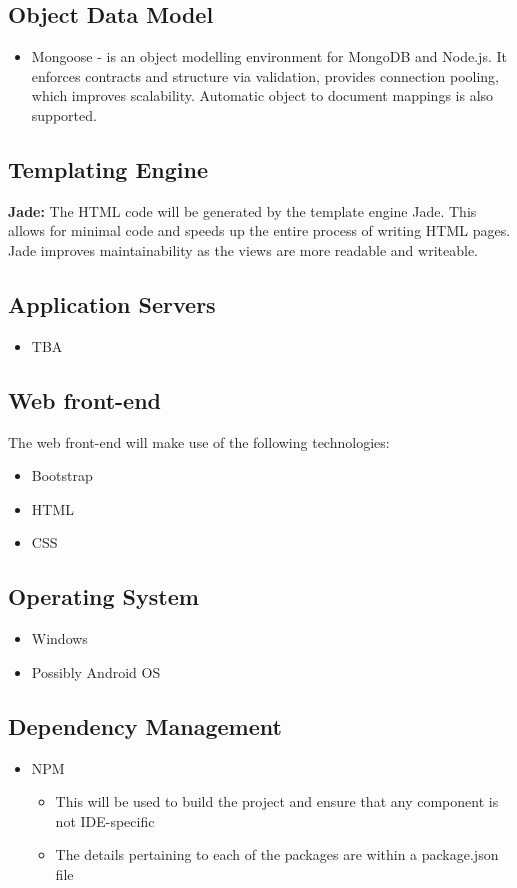 \subsection{Object Data Model}
\begin{itemize}
	\item Mongoose - is an object modelling environment for MongoDB and Node.js. It enforces contracts and structure via validation, provides connection pooling, which improves scalability. Automatic object to document mappings is also supported.
\end{itemize}

\subsection{Templating Engine}
\textbf{Jade:} The HTML code will be generated by the template engine Jade. This allows for minimal code and speeds up the entire process of writing HTML pages. Jade improves maintainability as the views are more readable and writeable.


\subsection{Application Servers}
\begin{itemize}
	\item TBA
\end{itemize}

\subsection{Web front-end}
The web front-end will make use of the following technologies:
\begin{itemize}
	\item Bootstrap
	\item HTML
	\item CSS
\end{itemize}

\subsection{Operating System}
\begin{itemize}
	\item Windows
	\item Possibly Android OS
\end{itemize}

\subsection{Dependency Management}
\begin{itemize}
	\item NPM
		\begin{itemize}
			\item This will be used to build the project and ensure that any component is not IDE-specific
			\item The details pertaining to each of the packages are within a package.json file				
		\end{itemize}
\end{itemize}

